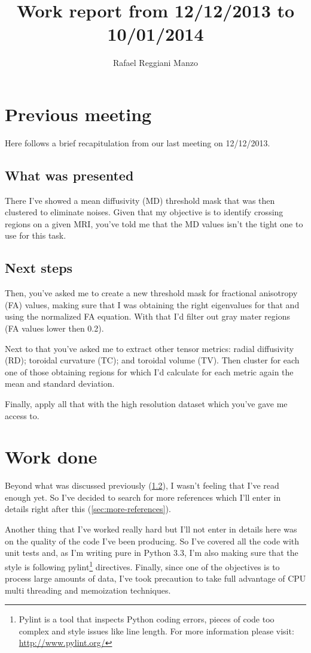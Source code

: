 \documentclass[a4paper,11pt]{report}
\title{Work report from 12/12/2013 to 10/01/2014}
\author{Rafael Reggiani Manzo}
\begin{document}
\maketitle
\tableofcontents

\begin{abstract}
\end{abstract}

\chapter{Previous meeting}
Here follows a brief recapitulation from our last meeting on 12/12/2013.

  \section{What was presented}
  There I've showed a mean diffusivity (MD) threshold mask that was then clustered to eliminate noises. Given that my objective is to identify crossing regions on a given MRI, you've told me that the MD values isn't the tight one to use for this task.

  \section{Next steps}\label{sec:next-steps}
  Then, you've asked me to create a new threshold mask for fractional anisotropy (FA) values, making sure that I was obtaining the right eigenvalues for that and using the normalized FA equation. With that I'd filter out gray mater regions (FA values lower then 0.2).

  Next to that you've asked me to extract other tensor metrics: radial diffusivity (RD); toroidal curvature (TC); and toroidal volume (TV). Then cluster for each one of those obtaining regions for which I'd calculate for each metric again the mean and standard deviation.

  Finally, apply all that with the high resolution dataset which you've gave me access to.

\chapter{Work done}
Beyond what was discussed previously (\ref{sec:next-steps}), I wasn't feeling that I've read enough yet. So I've decided to search for more references which I'll enter in details right after this (\ref{sec:more-references}).

Another thing that I've worked really hard but I'll not enter in details here was on the quality of the code I've been producing. So I've covered all the code with unit tests and, as I'm writing pure in Python 3.3, I'm also making sure that the style is following pylint\footnote{Pylint is a tool that inspects Python coding errors, pieces of code too complex and style issues like line length. For more information please visit: \url{http://www.pylint.org/}} directives. Finally, since one of the objectives is to process large amounts of data, I've took precaution to take full advantage of CPU multi threading and memoization techniques.
\end{document}
